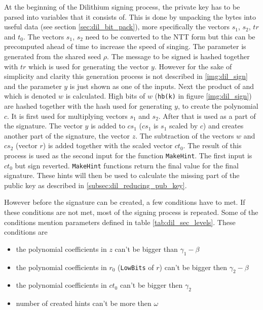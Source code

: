 At the beginning of the Dilithium signing process, the private key has to be parsed into variables that it consists of. This is done by unpacking the bytes into useful data (see section \ref{sec:dil_bit_pack}), more specifically the vectors $s_1$, $s_2$, $tr$ and $t_0$. The vectors $s_1$, $s_2$ need to be converted to the NTT form but this can be precomputed ahead of time to increase the speed of singing. The parameter  is generated from the shared seed $\rho$. The message to be signed is hashed together with $tr$ which is used for generating the vector $y$. However for the sake of simplicity and clarity this generation process is not described in \ref{img:dil_sign} and the parameter $y$ is just shown as one of the inputs. Next the product of  and  which is denoted $w$ is calculated. High bits of $w$ (\texttt{hb(k)} in figure \ref{img:dil_sign}) are hashed together with the hash used for generating $y$, to create the polynomial $c$. It is first used for multiplying vectors $s_1$ and $s_2$. After that is used as a part of the signature. The vector $y$ is added to $cs_1$ ($cs_1$ is $s_1$ scaled by $c$) and creates another part of the signature, the vector $z$. The subtraction of the vectors $w$ and $cs_2$ (vector $r$) is added together with the scaled vector $ct_0$. The result of this process is used as the second input for the function \texttt{MakeHint}. The first input is $ct_0$ but sign reverted. \texttt{MakeHint} functions return the final value for the final signature. These hints will then be used to calculate the missing part of the public key as described in \ref{subsec:dil_reducing_pub_key}.

However before the signature can be created, a few conditions have to met. If these conditions are not met, most of the signing process is repeated. Some of the conditions mention parameters defined in table \ref{tab:dil_sec_levels}. These conditions are
\begin{itemize}
  \item the polynomial coefficients in $z$ can't be bigger than $\gamma_1-\beta$
  \item the polynomial coefficients in $r_0$ (\texttt{LowBits} of $r$) can't be bigger then $\gamma_2-\beta$
  \item the polynomial coefficients in $ct_0$ can't be bigger then $\gamma_2$
  \item number of created hints can't be more then $\omega$
\end{itemize}
